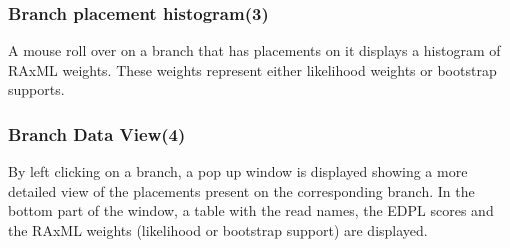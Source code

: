 \documentclass{article}
\begin{document}
          \subsubsection*{Branch placement histogram(3)}
          A mouse roll over on a branch that has placements on it displays a histogram of RAxML weights. These weights represent either likelihood weights or bootstrap supports.  
          \subsubsection*{Branch Data View(4)}
          By left clicking on a branch, a pop up window is displayed showing a more detailed view of the placements present on the corresponding branch. In the bottom part of the window, a table with the read names, the EDPL scores and the RAxML weights (likelihood or bootstrap support) are displayed. \\
\end{document}
